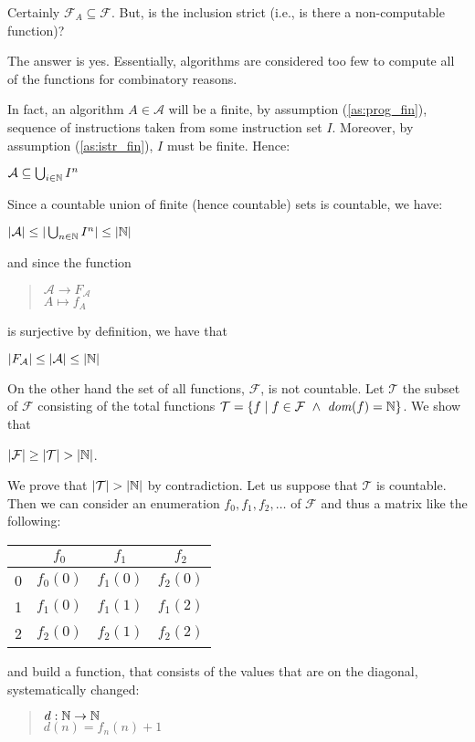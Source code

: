   Certainly $\mathcal{F}_A \subseteq \mathcal{F}$. But, is the inclusion
  strict (i.e., is there a non-computable function)?

  The answer is yes. Essentially, algorithms are considered too few to compute all of the functions for combinatory reasons.


  In fact, an algorithm $A \in \mathcal{A}$ will be a finite, by
  assumption (\ref{as:prog_fin}), sequence of instructions taken from
  some instruction set $I$. Moreover, by assumption (\ref{as:istr_fin}),
  $I$ must be finite. Hence:
  \begin{center}
    $\mathcal{A} \subseteq \bigcup_{i \in \mathbb{N}} I^n$
  \end{center}
  Since  a countable union of finite (hence countable) sets is countable, we have:
  \begin{center}
    $|\mathcal{A}| \leq |\bigcup_{n\in\mathbb{N}} I^n| \leq |\mathbb{N}|$
  \end{center}
  and since the function
  \begin{quote}
    $\mathcal{A} \to F_\mathcal{A}$\\
    $A \mapsto f_A$
  \end{quote}
  is surjective by definition, we have that
  \begin{center}
    $|F_\mathcal{A}| \leq |\mathcal{A}| \leq |\mathbb{N}|$
  \end{center}

  On the other hand the set of all functions, $\mathcal{F}$, is not countable. Let $\mathcal{T}$ the subset of $\mathcal{F}$ consisting of the total functions $\mathcal{T} = \{ f \mid f \in \mathcal{F}\ \land\ \mathit{dom}({f}) = \mathbb{N}\}$. We show that
  \begin{center}
    $|\mathcal{F}| \geq |\mathcal{T}| > |\mathbb{N}|$.
  \end{center}

  We prove that $|\mathcal{T}| > |\mathbb{N}|$ by contradiction. Let us suppose that $\mathcal{T}$ is countable. Then we can consider an enumeration $f_0, f_1, f_2, \ldots$ of $\mathcal{F}$ and thus a matrix like the following:
  \begin{center}
    \begin{tabular}{c|ccc}
      & $f_0$    & $f_1$    & $f_2$\\
      \hline
      0 & $f_0(0)$ & $f_1(0)$ & $f_2(0)$ \\
      1 & $f_1(0)$ & $f_1(1)$ & $f_1(2)$ \\
      2 & $f_2(0)$ & $f_2(1)$ & $f_2(2)$
    \end{tabular}
  \end{center}
  and build a function, that consists of the values that are on the diagonal, systematically changed:
  \begin{quote}
    $d: \mathbb{N} \to \mathbb{N}$\\
    $d(n) = f_n(n)+1$
  \end{quote}

